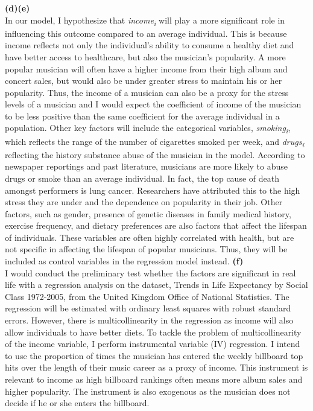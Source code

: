 \documentclass[letterpaper,12pt]{article}
\theoremstyle{definition}
\begin{document}
\noindent \flushleft \textbf{(d)(e)}\\
In our model, I hypothesize that \textit{income\textsubscript{i}} will play a more significant role in influencing this outcome compared to an average individual. This is because income reflects not only the individual’s ability to consume a healthy diet and have better access to healthcare, but also the musician’s popularity. A more popular musician will often have a higher income from their high album and concert sales, but would also be under greater stress to maintain his or her popularity. Thus, the income of a musician can also be a proxy for the stress levels of a musician and I would expect the coefficient of income of the musician to be less positive than the same coefficient for the average individual in a population.
\flushleft Other key factors will include the categorical variables, \textit{smoking\textsubscript{i}}, which reflects the range of the number of cigarettes smoked per week, and \textit{drugs\textsubscript{i}} reflecting the history substance abuse of the musician in the model. According to newspaper reportings and past literature, musicians are more likely to abuse drugs or smoke than an average individual. In fact, the top cause of death amongst performers is lung cancer. Researchers have attributed this to the high stress they are under and the dependence on popularity in their job.
\flushleft Other factors, such as gender, presence of genetic diseases in family medical history, exercise frequency, and dietary preferences are also factors that affect the lifespan of individuals. These variables are often highly correlated with health, but are not specific in affecting the lifespan of popular musicians. Thus, they will be included as control variables in the regression model instead. 
\pagebreak
\flushleft \textbf{(f)}\\
I would conduct the preliminary test whether the factors are significant in real life with a regression analysis on the dataset, Trends in Life Expectancy by Social Class 1972-2005, from the United Kingdom Office of National Statistics. The regression will be estimated with ordinary least squares with robust standard errors. 
\flushleft However, there is multicollinearity in the regression as income will also allow individuals to have better diets. To tackle the problem of multicollinearity of the income variable, I perform instrumental variable (IV) regression. I intend to use the proportion of times the musician has entered the weekly billboard top hits over the length of their music career as a proxy of income. This instrument is relevant to income as high billboard rankings often means more album sales and higher popularity. The instrument is also exogenous as the musician does not decide if he or she enters the billboard. \\
\end{document}
